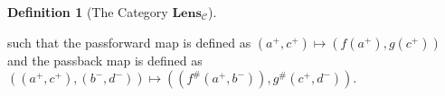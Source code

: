 \documentclass[12pt]{article}
\theoremstyle{definition}
\newtheorem{definition}{Definition}
\begin{document}
\begin{definition}[The Category $\textbf{Lens}_\mathcal{C}$]
\begin{enumerate}
              such that the passforward map is defined as $(a^+, c^+) \mapsto (f(a^+), g(c^+))$ and the passback map is defined as $((a^+, c^+), (b^-, d^-)) \mapsto ((f^\#(a^+, b^-)), g^\#(c^+, d^-))$.

    \end{enumerate}
\end{definition}


\nocite{*}

\pagebreak



\end{document}
